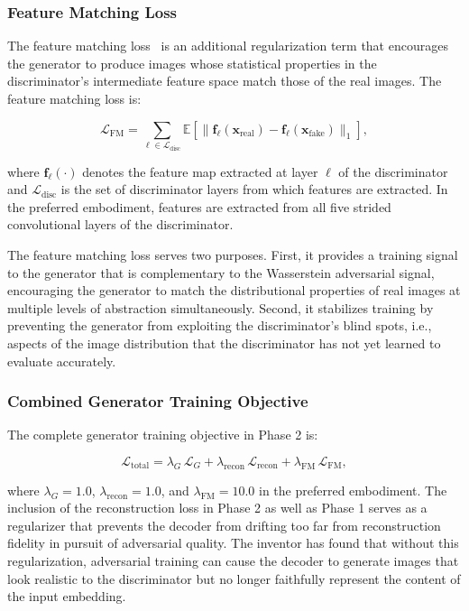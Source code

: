 \documentclass[12pt,letterpaper]{article}
\newcommand{\bx}{\mathbf{x}}
\newcommand{\EE}{\mathbb{E}}
\begin{document}
\subsubsection{Feature Matching Loss}

The feature matching loss~\cite{salimans2016} is an additional regularization
term that encourages the generator to produce images whose statistical
properties in the discriminator's intermediate feature space match those of
the real images. The feature matching loss is:

\begin{equation}
  \mathcal{L}_{\text{FM}} = \sum_{\ell \in \mathcal{L}_{\text{disc}}}
    \EE\!\left[\bigl\|\mathbf{f}_\ell(\bx_{\text{real}}) - \mathbf{f}_\ell(\bx_{\text{fake}})\bigr\|_1\right],
  \label{eq:fm}
\end{equation}

\noindent where $\mathbf{f}_\ell(\cdot)$ denotes the feature map extracted at
layer $\ell$ of the discriminator and $\mathcal{L}_{\text{disc}}$ is the set of
discriminator layers from which features are extracted. In the preferred
embodiment, features are extracted from all five strided convolutional layers
of the discriminator.

The feature matching loss serves two purposes. First, it provides a training
signal to the generator that is complementary to the Wasserstein adversarial
signal, encouraging the generator to match the distributional properties of
real images at multiple levels of abstraction simultaneously. Second, it
stabilizes training by preventing the generator from exploiting the
discriminator's blind spots, i.e., aspects of the image distribution that the
discriminator has not yet learned to evaluate accurately.

\subsubsection{Combined Generator Training Objective}

The complete generator training objective in Phase 2 is:

\begin{equation}
  \mathcal{L}_{\text{total}} = \lambda_G\,\mathcal{L}_G
    + \lambda_{\text{recon}}\,\mathcal{L}_{\text{recon}}
    + \lambda_{\text{FM}}\,\mathcal{L}_{\text{FM}},
  \label{eq:total}
\end{equation}

\noindent where $\lambda_G = 1.0$, $\lambda_{\text{recon}} = 1.0$, and
$\lambda_{\text{FM}} = 10.0$ in the preferred embodiment. The inclusion of the
reconstruction loss in Phase 2 as well as Phase 1 serves as a regularizer that
prevents the decoder from drifting too far from reconstruction fidelity in
pursuit of adversarial quality. The inventor has found that without this
regularization, adversarial training can cause the decoder to generate images
that look realistic to the discriminator but no longer faithfully represent the
content of the input embedding.
\end{document}
